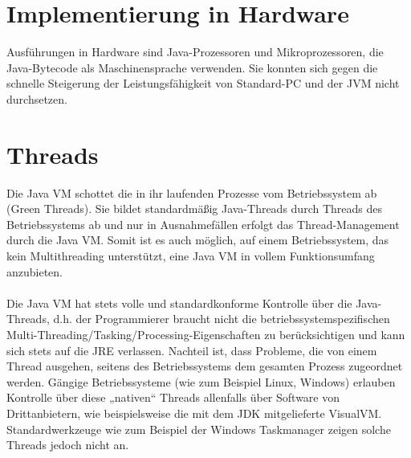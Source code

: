\documentclass[a4paper,14pt]{scrreprt}
\begin{document}
\section{Implementierung in Hardware}
Ausführungen in Hardware sind Java-Prozessoren und Mikroprozessoren, die Java-Bytecode als Maschinensprache verwenden. Sie konnten sich gegen die schnelle Steigerung der Leistungsfähigkeit von Standard-PC und der JVM nicht durchsetzen.
\section{Threads}
Die Java VM schottet die in ihr laufenden Prozesse vom Betriebssystem ab (Green Threads). Sie bildet standardmäßig Java-Threads durch Threads des Betriebssystems ab und nur in Ausnahmefällen erfolgt das Thread-Management durch die Java VM. Somit ist es auch möglich, auf einem Betriebssystem, das kein Multithreading unterstützt, eine Java VM in vollem Funktionsumfang anzubieten. \\\\Die Java VM hat stets volle und standardkonforme Kontrolle über die Java-Threads, d.h. der Programmierer braucht nicht die betriebssystemspezifischen Multi-Threading/Tasking/Processing-Eigenschaften zu berücksichtigen und kann sich stets auf die JRE verlassen. Nachteil ist, dass Probleme, die von einem Thread ausgehen, seitens des Betriebssystems dem gesamten Prozess zugeordnet werden. Gängige Betriebssysteme (wie zum Beispiel Linux, Windows) erlauben Kontrolle über diese „nativen“ Threads allenfalls über Software von Drittanbietern, wie beispielsweise die mit dem JDK mitgelieferte VisualVM. Standardwerkzeuge wie zum Beispiel der Windows Taskmanager zeigen solche Threads jedoch nicht an.
\end{document}
